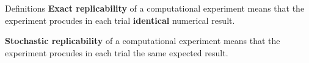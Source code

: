 \begin{frame}
\vspace*{2mm}
\begin{block}{
Definitions
}
{\bf Exact replicability} of a computational experiment means
that the experiment procudes in each trial {\bf identical}
numerical result.
 
{\bf Stochastic replicability} of a computational experiment means
that the experiment procudes in each trial the same 
expected result.
\end{block}
\end{frame}